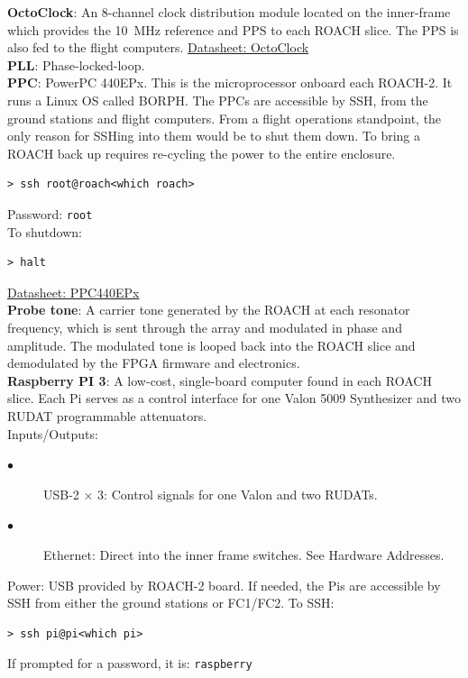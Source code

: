 \textbf{OctoClock}: An 8-channel clock distribution module located on the inner-frame which provides the 10~MHz reference and PPS to each ROACH slice. The PPS is also fed to the flight computers. \href{https://www.ettus.com/product/details/OctoClock}{Datasheet: OctoClock}\\
\textbf{PLL}: Phase-locked-loop.\\
\textbf{PPC}: PowerPC 440EPx. This is the microprocessor onboard each ROACH-2. It runs a Linux OS called BORPH\@. The PPCs are accessible by SSH, from the ground stations and flight computers. From a flight operations standpoint, the only reason for SSHing into them would be to shut them down. To bring a ROACH back up requires re-cycling the power to the entire enclosure.
\begin{verbatim}
> ssh root@roach<which roach>
\end{verbatim}
Password: \texttt{root}\\
To shutdown:
\begin{verbatim}
> halt
\end{verbatim}
\href{http://c1170156.r56.cf3.rackcdn.com/UK_AMC_PPC440EPx-SUA400T_2DS.pdf}{Datasheet: PPC440EPx}\\
\textbf{Probe tone}: A carrier tone generated by the ROACH at each resonator frequency, which is sent through the array and modulated in phase and amplitude. The modulated tone is looped back into the ROACH slice and demodulated by the FPGA firmware and electronics.\\
\textbf{Raspberry PI 3}: A low-cost, single-board computer found in each ROACH slice. Each Pi serves as a control interface for one Valon 5009 Synthesizer and two RUDAT programmable attenuators.\\
Inputs/Outputs:
\begin{description}
  \item[$\bullet$] USB-2 $\times$ 3: Control signals for one Valon and two RUDATs.
  \item[$\bullet$] Ethernet: Direct into the inner frame switches. See Hardware Addresses.
\end{description}
Power: USB provided by ROACH-2 board.
If needed, the Pis are accessible by SSH from either the ground stations or FC1/FC2. To SSH:\
\begin{verbatim}
> ssh pi@pi<which pi>
\end{verbatim}
If prompted for a password, it is: \texttt{raspberry}\\

